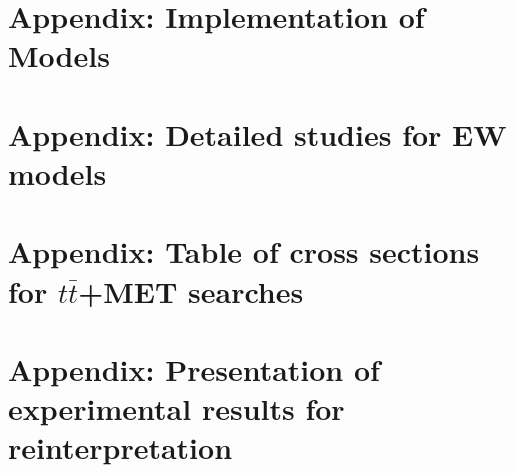 \documentclass[a4paper,debug,notitlepage,nobib]{tufte-book}
\begin{document}
\chapter{Appendix: Implementation of Models}
\label{app:MonojetLikeModels_Appendix}


\chapter{Appendix: Detailed studies for EW models}
\label{app:EWSpecificModels_Appendix}


\chapter{Appendix: Table of cross sections for $t\bar{t}$+MET searches}
\label{app:TTBar_Xsecs}


\chapter{Appendix: Presentation of experimental results for reinterpretation}
\label{app:Presentation_Of_Experimental_Results}


% 


\end{document}
